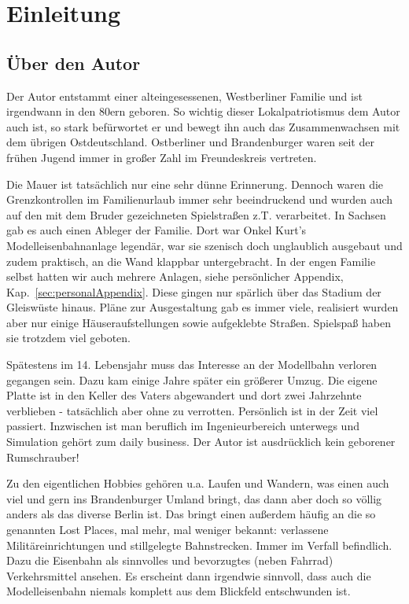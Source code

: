 \section{Einleitung}
\label{sec:introduction}

\subsection{\"Uber den Autor}
\label{sec:author}

Der Autor entstammt einer alteingesessenen, Westberliner Familie und ist irgendwann in den 80ern geboren.
So wichtig dieser Lokalpatriotismus dem Autor auch ist, so stark bef\"urwortet er und bewegt ihn auch das Zusammenwachsen mit dem \"ubrigen Ostdeutschland.
Ostberliner und Brandenburger waren seit der fr\"uhen Jugend immer in gro{\ss}er Zahl im Freundeskreis vertreten.

Die Mauer ist tats\"achlich nur eine sehr d\"unne Erinnerung.
Dennoch waren die Grenzkontrollen im Familienurlaub immer sehr beeindruckend und wurden auch auf den mit dem Bruder gezeichneten Spielstra{\ss}en z.T. verarbeitet.
In Sachsen gab es auch einen Ableger der Familie.
Dort war Onkel Kurt's Modelleisenbahnanlage legend\"ar, war sie szenisch doch unglaublich ausgebaut und zudem praktisch, an die Wand klappbar untergebracht.
In der engen Familie selbst hatten wir auch mehrere Anlagen, siehe pers\"onlicher Appendix, Kap.~\ref{sec:personalAppendix}.
Diese gingen nur sp\"arlich \"uber das Stadium der Gleisw\"uste hinaus.
Pl\"ane zur Ausgestaltung gab es immer viele, realisiert wurden aber nur einige H\"auseraufstellungen sowie aufgeklebte Stra{\ss}en.
Spielspa{\ss} haben sie trotzdem viel geboten.

Sp\"atestens im 14. Lebensjahr muss das Interesse an der Modellbahn verloren gegangen sein.
Dazu kam einige Jahre sp\"ater ein gr\"o{\ss}erer Umzug.
Die eigene Platte ist in den Keller des Vaters abgewandert und dort zwei Jahrzehnte verblieben - tats\"achlich aber ohne zu verrotten.
Pers\"onlich ist in der Zeit viel passiert.
Inzwischen ist man beruflich im Ingenieurbereich unterwegs und Simulation geh\"ort zum daily business.
Der Autor ist ausdr\"ucklich kein geborener Rumschrauber!

Zu den eigentlichen Hobbies geh\"oren u.a. Laufen und Wandern, was einen auch viel und gern ins Brandenburger Umland bringt, das dann aber doch so v\"ollig anders als das diverse Berlin ist.
Das bringt einen au{\ss}erdem h\"aufig an die so genannten Lost Places, mal mehr, mal weniger bekannt:
verlassene Milit\"areinrichtungen und stillgelegte Bahnstrecken.
Immer im Verfall befindlich.
Dazu die Eisenbahn als sinnvolles und bevorzugtes (neben Fahrrad) Verkehrsmittel ansehen.
Es erscheint dann irgendwie sinnvoll, dass auch die Modelleisenbahn niemals komplett aus dem Blickfeld entschwunden ist.

